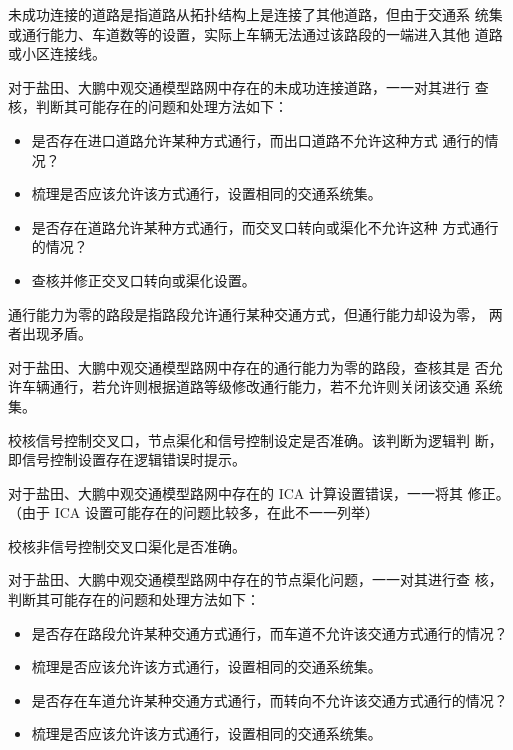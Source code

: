 
未成功连接的道路是指道路从拓扑结构上是连接了其他道路，但由于交通系
统集或通行能力、车道数等的设置，实际上车辆无法通过该路段的一端进入其他
道路或小区连接线。

对于盐田、大鹏中观交通模型路网中存在的未成功连接道路，一一对其进行
查核，判断其可能存在的问题和处理方法如下：

\begin{itemize}
\item[\XSolidBrush] 是否存在进口道路允许某种方式通行，而出口道路不允许这种方式
通行的情况？
\item[\Checkmark] 梳理是否应该允许该方式通行，设置相同的交通系统集。
\item[\XSolidBrush] 是否存在道路允许某种方式通行，而交叉口转向或渠化不允许这种
方式通行的情况？
\item[\Checkmark] 查核并修正交叉口转向或渠化设置。
\end{itemize}


通行能力为零的路段是指路段允许通行某种交通方式，但通行能力却设为零，
两者出现矛盾。

对于盐田、大鹏中观交通模型路网中存在的通行能力为零的路段，查核其是
否允许车辆通行，若允许则根据道路等级修改通行能力，若不允许则关闭该交通
系统集。


校核信号控制交叉口，节点渠化和信号控制设定是否准确。该判断为逻辑判
断，即信号控制设置存在逻辑错误时提示。

对于盐田、大鹏中观交通模型路网中存在的 ICA 计算设置错误，一一将其
修正。（由于 ICA 设置可能存在的问题比较多，在此不一一列举）


校核非信号控制交叉口渠化是否准确。

对于盐田、大鹏中观交通模型路网中存在的节点渠化问题，一一对其进行查
核，判断其可能存在的问题和处理方法如下：

\begin{itemize}
\item[\XSolidBrush] 是否存在路段允许某种交通方式通行，而车道不允许该交通方式通行的情况？
\item[\Checkmark] 梳理是否应该允许该方式通行，设置相同的交通系统集。
\item[\XSolidBrush] 是否存在车道允许某种交通方式通行，而转向不允许该交通方式通行的情况？
\item[\Checkmark] 梳理是否应该允许该方式通行，设置相同的交通系统集。
\end{itemize}

